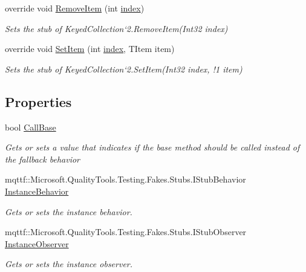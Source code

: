 \begin{DoxyCompactItemize}
override void \hyperlink{class_system_1_1_collections_1_1_object_model_1_1_fakes_1_1_stub_keyed_collection_3_01_t_key_00_01_t_item_01_4_af2c7d0cdabf348ced07da240258b524c}{Remove\-Item} (int \hyperlink{jquery-1_810_82-vsdoc_8js_a75bb12d1f23302a9eea93a6d89d0193e}{index})
\begin{DoxyCompactList}\small\item\em Sets the stub of Keyed\-Collection`2.Remove\-Item(\-Int32 index)\end{DoxyCompactList}\item 
override void \hyperlink{class_system_1_1_collections_1_1_object_model_1_1_fakes_1_1_stub_keyed_collection_3_01_t_key_00_01_t_item_01_4_ab7542510a0e063942d47c833d5bd54d7}{Set\-Item} (int \hyperlink{jquery-1_810_82-vsdoc_8js_a75bb12d1f23302a9eea93a6d89d0193e}{index}, T\-Item item)
\begin{DoxyCompactList}\small\item\em Sets the stub of Keyed\-Collection`2.Set\-Item(Int32 index, !1 item)\end{DoxyCompactList}\end{DoxyCompactItemize}
\subsection*{Properties}
\begin{DoxyCompactItemize}
\item 
bool \hyperlink{class_system_1_1_collections_1_1_object_model_1_1_fakes_1_1_stub_keyed_collection_3_01_t_key_00_01_t_item_01_4_a68065d19a06ae6c160ee0ae33d4d8fbf}{Call\-Base}
\begin{DoxyCompactList}\small\item\em Gets or sets a value that indicates if the base method should be called instead of the fallback behavior\end{DoxyCompactList}\item 
mqttf\-::\-Microsoft.\-Quality\-Tools.\-Testing.\-Fakes.\-Stubs.\-I\-Stub\-Behavior \hyperlink{class_system_1_1_collections_1_1_object_model_1_1_fakes_1_1_stub_keyed_collection_3_01_t_key_00_01_t_item_01_4_adbb11a92e66814afbba7787dfaba37f5}{Instance\-Behavior}
\begin{DoxyCompactList}\small\item\em Gets or sets the instance behavior.\end{DoxyCompactList}\item 
mqttf\-::\-Microsoft.\-Quality\-Tools.\-Testing.\-Fakes.\-Stubs.\-I\-Stub\-Observer \hyperlink{class_system_1_1_collections_1_1_object_model_1_1_fakes_1_1_stub_keyed_collection_3_01_t_key_00_01_t_item_01_4_aff7a9ed289fb2487562e64436c26e90a}{Instance\-Observer}
\begin{DoxyCompactList}\small\item\em Gets or sets the instance observer.\end{DoxyCompactList}\end{DoxyCompactItemize}


